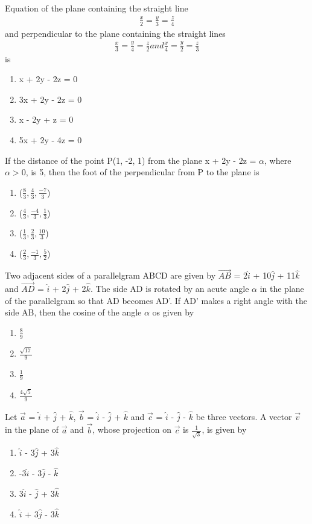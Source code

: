 \item Equation of the plane containing the straight line 
\begin{align*}
\frac{x}{2} = \frac{y}{3} = \frac{z}{4}
\end{align*}
and perpendicular to the plane containing the straight lines 
\begin{align*}
\frac{x}{3} = \frac{y}{4} = \frac{z}{2} and \frac{x}{4} = \frac{y}{2} = \frac{z}{3}
\end{align*}
is
\begin{enumerate}
\item x + 2y - 2z = 0
\item 3x + 2y - 2z = 0
\item x - 2y + z = 0
\item 5x + 2y - 4z = 0
\end{enumerate}

\item If the distance of the point P(1, -2, 1) from the plane x + 2y - 2z = $\alpha$, where $\alpha > 0$, is 5, then the foot of the perpendicular from P to the plane is
\begin{enumerate}
\item ($\frac{8}{3}, \frac{4}{3}, \frac{-7}{3}$)
\item ($\frac{4}{3}, \frac{-4}{3}, \frac{1}{3}$)
\item ($\frac{1}{3}, \frac{2}{3}, \frac{10}{3}$)
\item ($\frac{2}{3}, \frac{-1}{3}, \frac{5}{2}$)
\end{enumerate}

\item Two adjacent sides of a parallelgram ABCD are given by $\overrightarrow{AB}$ = 2$\hat{i}$ + 10$\hat{j}$ + 11$\hat{k}$ and $\overrightarrow{AD}$ = $\hat{i}$ + 2$\hat{j}$ + 2$\hat{k}$. The side AD is rotated by an acute angle $\alpha$ in the plane of the parallelgram so that AD becomes AD'. If AD' makes a right angle with the side AB, then the cosine of the angle $\alpha$ os given by
\begin{enumerate}
\item $\frac{8}{9}$
\item $\frac{\sqrt{17}}{9}$
\item $\frac{1}{9}$
\item $\frac{4\sqrt{5}}{9}$
\end{enumerate}

\item Let $\overrightarrow{a}$ = $\hat{i}$ + $\hat{j}$ + $\hat{k}$, $\overrightarrow{b}$ = $\hat{i}$ - $\hat{j}$ + $\hat{k}$ and $\overrightarrow{c}$ = $\hat{i}$ - $\hat{j}$ - $\hat{k}$ be three vectors. A vector 
$\overrightarrow{v}$ in the plane of $\overrightarrow{a}$ and $\overrightarrow{b}$, whose projection on $\overrightarrow{c}$ is $\frac{1}{\sqrt{3}}$, is given by
\begin{enumerate}
\item $\hat{i}$ - 3$\hat{j}$ + 3$\hat{k}$
\item -3$\hat{i}$ - 3$\hat{j}$  -  $\hat{k}$
\item 3$\hat{i}$ - $\hat{j}$ + 3$\hat{k}$
\item $\hat{i}$ + 3$\hat{j}$ - 3$\hat{k}$
\end{enumerate}


